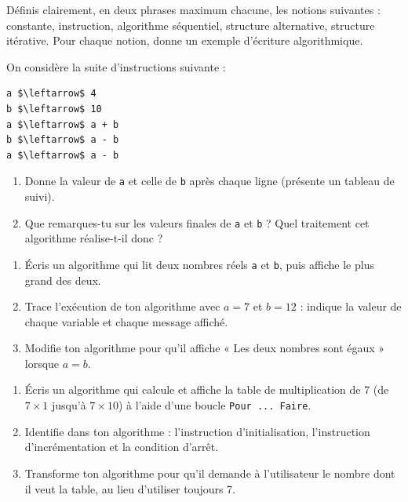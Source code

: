 \documentclass[11pt]{article}
\newcommand{\cle}[1]{{\popxbold\color{popdark}#1}}
\newcounter{popsec}
\newcounter{popsub}
\newcommand{\courssub}[1]{%
  \stepcounter{popsub}%
  \par\vspace{9pt}\noindent{\popxbold\fontsize{11.5}{13}\selectfont\color{popink}{\color{poporange}\thepopsec.\thepopsub}\hspace{6pt}#1}\par\nopagebreak\vspace{4pt}
}
\begin{document}
\begin{exercice}[Définitions]
Définis clairement, en deux phrases maximum chacune, les notions suivantes : \cle{constante}, \cle{instruction}, \cle{algorithme séquentiel}, \cle{structure alternative}, \cle{structure itérative}. Pour chaque notion, donne un exemple d'écriture algorithmique.
\end{exercice}

\begin{exercice}
On considère la suite d'instructions suivante :
\begin{lstlisting}
a $\leftarrow$ 4
b $\leftarrow$ 10
a $\leftarrow$ a + b
b $\leftarrow$ a - b
a $\leftarrow$ a - b
\end{lstlisting}
\begin{enumerate}
  \item Donne la valeur de \texttt{a} et celle de \texttt{b} après chaque ligne (présente un tableau de suivi).
  \item Que remarques-tu sur les valeurs finales de \texttt{a} et \texttt{b} ? Quel traitement cet algorithme réalise-t-il donc ?
\end{enumerate}
\end{exercice}

\courssub{Je m'entraîne}

\begin{exercice}
\begin{enumerate}
  \item Écris un algorithme qui lit deux nombres réels \texttt{a} et \texttt{b}, puis affiche le plus grand des deux.
  \item Trace l'exécution de ton algorithme avec $a = 7$ et $b = 12$ : indique la valeur de chaque variable et chaque message affiché.
  \item Modifie ton algorithme pour qu'il affiche « Les deux nombres sont égaux » lorsque $a = b$.
\end{enumerate}
\end{exercice}

\begin{exercice}
\begin{enumerate}
  \item Écris un algorithme qui calcule et affiche la table de multiplication de 7 (de $7 \times 1$ jusqu'à $7 \times 10$) à l'aide d'une boucle \texttt{Pour ... Faire}.
  \item Identifie dans ton algorithme : l'instruction d'initialisation, l'instruction d'incrémentation et la condition d'arrêt.
  \item Transforme ton algorithme pour qu'il demande à l'utilisateur le nombre dont il veut la table, au lieu d'utiliser toujours 7.
\end{enumerate}
\end{exercice}
\end{document}
